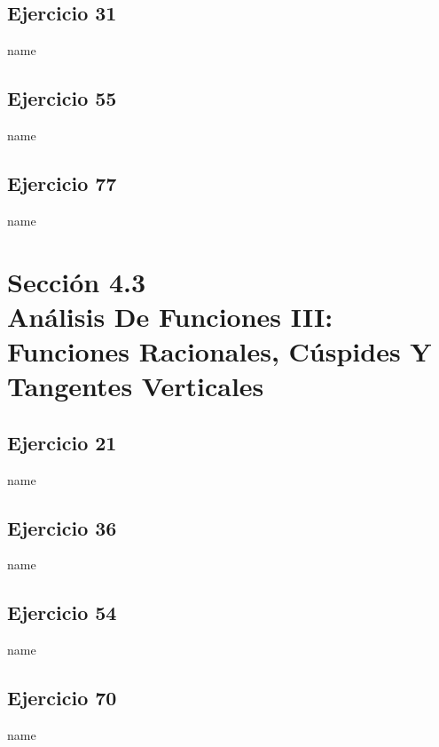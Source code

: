 \documentclass[12pt]{article}
\begin{document}
\subsection{Ejercicio 31} name \\
\subsection{Ejercicio 55} name \\
\subsection{Ejercicio 77} name \\

\section{Sección 4.3 \\  Análisis De Funciones III: Funciones Racionales, Cúspides Y Tangentes Verticales}
\subsection{Ejercicio 21} name \\
\subsection{Ejercicio 36} name \\
\subsection{Ejercicio 54} name \\
\subsection{Ejercicio 70} name \\
\end{document}
